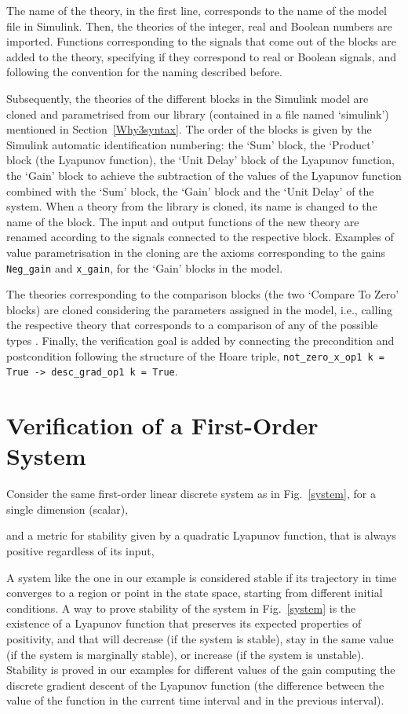 \documentclass[a4paper]{article}
\begin{document}
The name of the theory, in the first line, corresponds to the name of the model file in Simulink. Then, the theories of the integer, real and Boolean numbers are imported. Functions corresponding to the signals that come out of the blocks are added to the theory, specifying if they correspond to real or Boolean signals, and following the convention for the naming described before. 

Subsequently, the theories of the different blocks in the Simulink model are cloned and parametrised from our library (contained in a file named `simulink') mentioned in Section~\ref{Why3syntax}. The order of the blocks is given by the Simulink automatic identification numbering: the `Sum' block, the `Product' block (the Lyapunov function), the `Unit Delay' block of the Lyapunov function, the `Gain' block to achieve the subtraction of the values of the Lyapunov function combined with the `Sum' block, the `Gain' block and the `Unit Delay' of the system.  When a theory from the library is cloned, its name is changed to the name of the block. The input and output functions of the new theory are renamed according to the signals connected to the respective block. Examples of value parametrisation in the cloning are the axioms corresponding to the gains \verb+Neg_gain+ and \verb+x_gain+, for the `Gain' blocks in the model. 

The theories corresponding to the comparison blocks (the two `Compare To Zero' blocks) are cloned considering the parameters assigned in the model, i.e., calling the respective theory that corresponds to a comparison of any of the possible types . Finally, the verification goal is added by connecting the precondition and postcondition following the structure of the Hoare triple, \verb+not_zero_x_op1 k = True -> desc_grad_op1 k = True+.

\section{Verification of a First-Order System}\label{verification}

Consider the same first-order linear discrete system as in Fig.~\ref{system}, for a single dimension (scalar),

and a metric for stability given by a quadratic Lyapunov function, that is always positive regardless of its input,


A system like the one in our example is considered stable if its trajectory in time converges to a region or point in the state space, starting from different initial conditions. A way to prove stability of the system in Fig.~\ref{system} is the existence of a Lyapunov function that preserves its expected properties of positivity, and that will decrease (if the system is stable), stay in the same value (if the system is marginally stable), or increase (if the system is unstable). Stability is proved in our examples for different values of the gain  computing the discrete gradient descent of the Lyapunov function (the difference between the value of the function in the current time interval and in the previous interval). 
\end{document}
